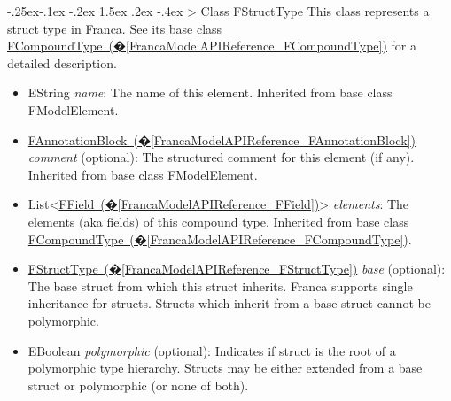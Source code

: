\documentclass[a4paper,10pt]{scrreprt}
\makeatletter
\renewcommand\subsection{\medskip\@startsection{subsection}{2}{\z@}%
  {-.25ex\@plus -.1ex \@minus -.2ex}%
  {1.5ex \@plus .2ex \@minus -.4ex}%
  {\ifnum \scr@compatibility>\@nameuse{scr@v@2.96}\relax
    \setlength{\parfillskip}{\z@ plus 1fil}\fi
    \raggedsection\normalfont\sectfont\nobreak\size@subsection
  }%
}
\newlength{\XdocItemIndent}
\makeatother
\begin{document}
\subsection{Class FStructType}
\label{FrancaModelAPIReference_FStructType}
This class represents a struct type in Franca. See its base class
\hyperref[FrancaModelAPIReference_FCompoundType]{FCompoundType~(�\ref*{FrancaModelAPIReference_FCompoundType})}
for a detailed description.
\setlength{\XdocItemIndent}{\textwidth}
\begin{itemize}
\addtolength{\XdocItemIndent}{-2.5em}
\item \begin{minipage}[t]{\XdocItemIndent}
EString \textit{name}: The name of this element.
		 Inherited from base class FModelElement.

\end{minipage}
\item \begin{minipage}[t]{\XdocItemIndent}
\hyperref[FrancaModelAPIReference_FAnnotationBlock]{FAnnotationBlock~(�\ref*{FrancaModelAPIReference_FAnnotationBlock})} \textit{comment} (optional): The structured comment for this element (if any).
		 Inherited from base class FModelElement.

\end{minipage}
\item \begin{minipage}[t]{\XdocItemIndent}
List<\hyperref[FrancaModelAPIReference_FField]{FField~(�\ref*{FrancaModelAPIReference_FField})}> \textit{elements}: The elements (aka fields) of this compound type.
		 Inherited from base class \hyperref[FrancaModelAPIReference_FCompoundType]{FCompoundType~(�\ref*{FrancaModelAPIReference_FCompoundType})}.

\end{minipage}
\item \begin{minipage}[t]{\XdocItemIndent}
\hyperref[FrancaModelAPIReference_FStructType]{FStructType~(�\ref*{FrancaModelAPIReference_FStructType})} \textit{base} (optional): The base struct from which this struct inherits. Franca supports single inheritance for structs. Structs which inherit from a base struct cannot be polymorphic.

\end{minipage}
\item \begin{minipage}[t]{\XdocItemIndent}
EBoolean \textit{polymorphic} (optional): Indicates if struct is the root of a polymorphic type hierarchy. Structs may be either extended from a base struct or polymorphic (or none of both).

\end{minipage}
\end{itemize}
\addtolength{\XdocItemIndent}{2.5em}
\end{document}
